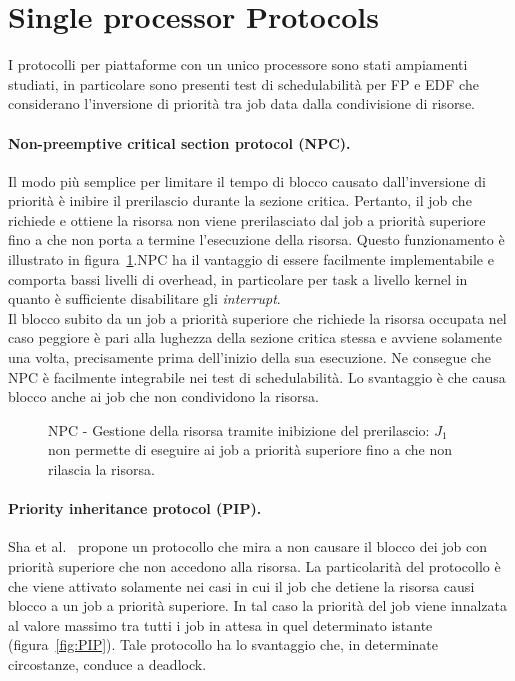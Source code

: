 \section{Single processor Protocols}
\label{sec:lockProtocols.single}

I protocolli per piattaforme con un unico processore sono stati ampiamenti studiati, in particolare sono presenti test di schedulabilità per FP e EDF che considerano l'inversione di priorità tra job data dalla condivisione di risorse.

\paragraph{Non-preemptive critical section protocol (NPC).} Il modo più semplice per limitare il tempo di blocco causato dall'inversione di priorità è inibire il prerilascio durante la sezione critica. Pertanto, il job che richiede e ottiene la risorsa non viene prerilasciato dal job a priorità superiore fino a che non porta a termine l'esecuzione della risorsa. Questo funzionamento è illustrato in figura~\ref{fig:NPC}.NPC ha il vantaggio di essere facilmente implementabile e comporta bassi livelli di overhead, in particolare per task a livello kernel in quanto è sufficiente disabilitare gli \textit{interrupt}.\\
Il blocco subito da un job a priorità superiore che richiede la risorsa occupata nel caso peggiore è pari alla lughezza della sezione critica stessa e avviene solamente una volta, precisamente prima dell'inizio della sua esecuzione. Ne consegue che NPC è facilmente integrabile nei test di schedulabilità. Lo svantaggio è che causa blocco anche ai job che non condividono la risorsa.

\begin{figure}
\centering
\NPC
\caption{NPC - Gestione della risorsa tramite inibizione del prerilascio: $J_1$ non permette di eseguire ai job a priorità superiore fino a che non rilascia la risorsa.}
\label{fig:NPC}
\end{figure}

\paragraph{Priority inheritance protocol (PIP).} Sha et al.~\cite{Sha:1990:PIP:102822.626613} propone un protocollo che mira a non causare il blocco dei job con priorità superiore che non accedono alla risorsa. La particolarità del protocollo è che viene attivato solamente nei casi in cui il job che detiene la risorsa causi blocco a un job a priorità superiore. In tal caso la priorità del job viene innalzata al valore massimo tra tutti i job in attesa in quel determinato istante (figura~\ref{fig:PIP}). Tale protocollo ha lo svantaggio che, in determinate circostanze, conduce a deadlock.

